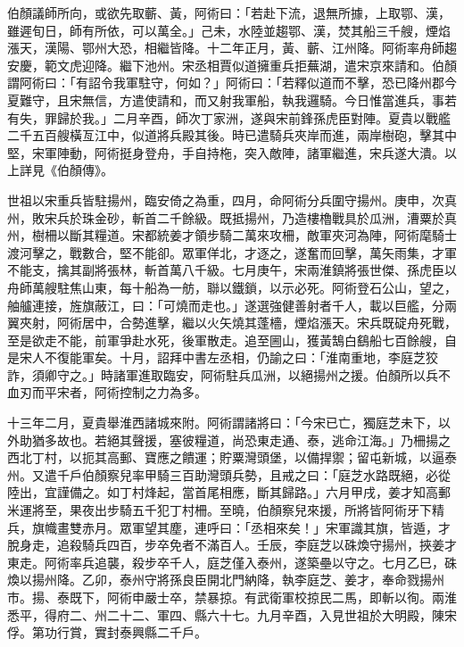\begin{pinyinscope}
 伯顏議師所向，或欲先取蘄、黃，阿術曰：「若赴下流，退無所據，上取鄂、漢，雖遲旬日，師有所依，可以萬全。」己未，水陸並趨鄂、漢，焚其船三千艘，煙焰漲天，漢陽、鄂州大恐，相繼皆降。十二年正月，黃、蘄、江州降。阿術率舟師趨安慶，範文虎迎降。繼下池州。宋丞相賈似道擁重兵拒蕪湖，遣宋京來請和。伯顏謂阿術曰：「有詔令我軍駐守，何如？」阿術曰：「若釋似道而不擊，恐已降州郡今夏難守，且宋無信，方遣使請和，而又射我軍船，執我邏騎。今日惟當進兵，事若有失，罪歸於我。」二月辛酉，師次丁家洲，遂與宋前鋒孫虎臣對陣。夏貴以戰艦二千五百艘橫亙江中，似道將兵殿其後。時已遣騎兵夾岸而進，兩岸樹砲，擊其中堅，宋軍陣動，阿術挺身登舟，手自持柂，突入敵陣，諸軍繼進，宋兵遂大潰。以上詳見《伯顏傳》。



 世祖以宋重兵皆駐揚州，臨安倚之為重，四月，命阿術分兵圍守揚州。庚申，次真州，敗宋兵於珠金砂，斬首二千餘級。既抵揚州，乃造樓櫓戰具於瓜洲，漕粟於真州，樹柵以斷其糧道。宋都統姜才領步騎二萬來攻柵，敵軍夾河為陣，阿術麾騎士渡河擊之，戰數合，堅不能卻。眾軍佯北，才逐之，遂奮而回擊，萬矢雨集，才軍不能支，擒其副將張林，斬首萬八千級。七月庚午，宋兩淮鎮將張世傑、孫虎臣以舟師萬艘駐焦山東，每十船為一舫，聯以鐵鎖，以示必死。阿術登石公山，望之，舳艫連接，旌旗蔽江，曰：「可燒而走也。」遂選強健善射者千人，載以巨艦，分兩翼夾射，阿術居中，合勢進擊，繼以火矢燒其蓬檣，煙焰漲天。宋兵既碇舟死戰，至是欲走不能，前軍爭赴水死，後軍散走。追至圌山，獲黃鵠白鷂船七百餘艘，自是宋人不復能軍矣。十月，詔拜中書左丞相，仍諭之曰：「淮南重地，李庭芝狡詐，須卿守之。」時諸軍進取臨安，阿術駐兵瓜洲，以絕揚州之援。伯顏所以兵不血刃而平宋者，阿術控制之力為多。



 十三年二月，夏貴舉淮西諸城來附。阿術謂諸將曰：「今宋已亡，獨庭芝未下，以外助猶多故也。若絕其聲援，塞彼糧道，尚恐東走通、泰，逃命江海。」乃柵揚之西北丁村，以扼其高郵、寶應之饋運；貯粟灣頭堡，以備捍禦；留屯新城，以逼泰州。又遣千戶伯顏察兒率甲騎三百助灣頭兵勢，且戒之曰：「庭芝水路既絕，必從陸出，宜謹備之。如丁村烽起，當首尾相應，斷其歸路。」六月甲戌，姜才知高郵米運將至，果夜出步騎五千犯丁村柵。至曉，伯顏察兒來援，所將皆阿術牙下精兵，旗幟畫雙赤月。眾軍望其塵，連呼曰：「丞相來矣！」宋軍識其旗，皆遁，才脫身走，追殺騎兵四百，步卒免者不滿百人。壬辰，李庭芝以硃煥守揚州，挾姜才東走。阿術率兵追襲，殺步卒千人，庭芝僅入泰州，遂築壘以守之。七月乙巳，硃煥以揚州降。乙卯，泰州守將孫良臣開北門納降，執李庭芝、姜才，奉命戮揚州市。揚、泰既下，阿術申嚴士卒，禁暴掠。有武衛軍校掠民二馬，即斬以徇。兩淮悉平，得府二、州二十二、軍四、縣六十七。九月辛酉，入見世祖於大明殿，陳宋俘。第功行賞，實封泰興縣二千戶。




\end{pinyinscope}
